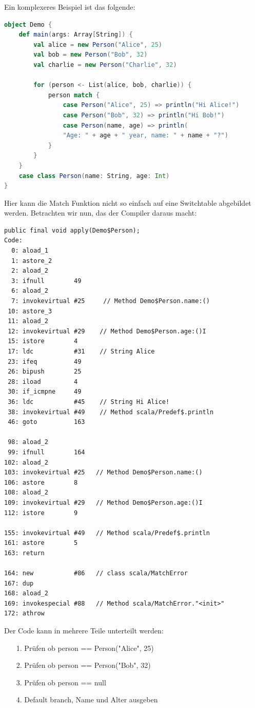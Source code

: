 \documentclass[a4paper, 11pt]{article}
\begin{document}
	  Ein komplexeres Beispiel ist das folgende:
	  \begin{lstlisting}[language=Scala]
object Demo {
	def main(args: Array[String]) {
		val alice = new Person("Alice", 25)
		val bob = new Person("Bob", 32)
		val charlie = new Person("Charlie", 32)
		
		for (person <- List(alice, bob, charlie)) {
			person match {
				case Person("Alice", 25) => println("Hi Alice!")
				case Person("Bob", 32) => println("Hi Bob!")
				case Person(name, age) => println(
				"Age: " + age + " year, name: " + name + "?")
			}
		}
	}
	case class Person(name: String, age: Int)
}
	  \end{lstlisting}
	  Hier kann die Match Funktion nicht so einfach auf eine Switchtable abgebildet werden. Betrachten wir nun, das der Compiler daraus macht:
	\begin{lstlisting}[language=JVMIS]
public final void apply(Demo$Person);
Code:
  0: aload_1
  1: astore_2
  2: aload_2
  3: ifnull        49
  6: aload_2
  7: invokevirtual #25     // Method Demo$Person.name:()
 10: astore_3
 11: aload_2
 12: invokevirtual #29    // Method Demo$Person.age:()I
 15: istore        4
 17: ldc           #31    // String Alice
 23: ifeq          49
 26: bipush        25
 28: iload         4
 30: if_icmpne     49
 36: ldc           #45    // String Hi Alice!
 38: invokevirtual #49    // Method scala/Predef$.println
 46: goto          163

 98: aload_2
 99: ifnull        164
102: aload_2
103: invokevirtual #25   // Method Demo$Person.name:()
106: astore        8
108: aload_2
109: invokevirtual #29   // Method Demo$Person.age:()I
112: istore        9

155: invokevirtual #49   // Method scala/Predef$.println
161: astore        5
163: return

164: new           #86   // class scala/MatchError
167: dup
168: aload_2
169: invokespecial #88   // Method scala/MatchError."<init>"
172: athrow
	\end{lstlisting}
	
	Der Code kann in mehrere Teile unterteilt werden:
	\begin{itemize}
		\item[1.]Prüfen ob person == Person("Alice", 25)
		\item[2.]Prüfen ob person == Person("Bob", 32)
		\item[3.]Prüfen ob person == null
		\item[4.]Default branch, Name und Alter ausgeben		
	\end{itemize}
\end{document}
